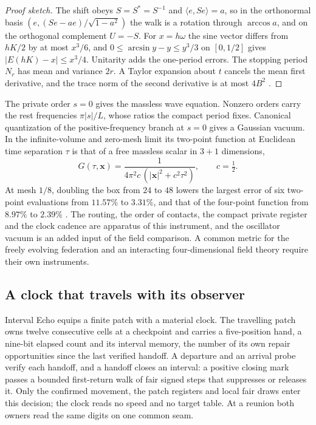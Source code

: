 \documentclass[11pt]{article}
\theoremstyle{definition}
\theoremstyle{remark}
\begin{document}
\begin{proof}[Proof sketch]
The shift obeys $S=S^{*}=S^{-1}$ and $\langle e,Se\rangle=a$, so in the
orthonormal basis $(e,(Se-ae)/\sqrt{1-a^2})$ the walk is a rotation
through $\arccos a$, and on the orthogonal complement $U=-S$. For
$x=h\omega$ the sine vector differs from $hK/2$ by at most $x^3/6$, and
$0\le\arcsin y-y\le y^3/3$ on $[0,1/2]$ gives $|E(hK)-x|\le x^3/4$.
Unitarity adds the one-period errors. The stopping period $N_r$ has mean
and variance $2r$. A Taylor expansion about $t$ cancels the mean first
derivative, and the trace norm of the second derivative is at most
$4B^2$ \cite{ophmodel}.
\end{proof}

The private order $s=0$ gives the massless wave equation. Nonzero orders
carry the rest frequencies $\pi|s|/L$, whose ratios the compact period
fixes. Canonical quantization of the positive-frequency branch at $s=0$
gives a Gaussian vacuum. In the infinite-volume and zero-mesh limit its
two-point function at Euclidean time separation $\tau$ is that of a free
massless scalar in $3{+}1$ dimensions,
\[
 G(\tau,\mathbf x)=\frac{1}{4\pi^2c\,(|\mathbf x|^2+c^2\tau^2)},\qquad c=\tfrac12 .
\]
At mesh $1/8$, doubling the box from $24$ to $48$ lowers the largest
error of six two-point evaluations from $11.57\%$ to $3.31\%$, and that
of the four-point function from $8.97\%$ to $2.39\%$ \cite{ophmodel}.
The routing, the order of contacts, the compact private register and the
clock cadence are apparatus of this instrument, and the oscillator
vacuum is an added input of the field comparison. A common metric for
the freely evolving federation and an interacting four-dimensional field
theory require their own instruments.

\subsection{A clock that travels with its observer}
\label{sec:travelling-clock}

Interval Echo equips a finite patch with a material clock. The travelling
patch owns twelve consecutive cells at a checkpoint and carries a
five-position hand, a nine-bit elapsed count and its interval memory, the
number of its own repair opportunities since the last verified handoff. A
departure and an arrival probe verify each handoff, and a handoff closes an
interval: a positive closing mark passes a bounded first-return walk of
fair signed steps that suppresses or releases it. Only the confirmed
movement, the patch registers and local fair draws enter this decision;
the clock reads no speed and no target table. At a reunion both owners
read the same digits on one common seam.
\end{document}
